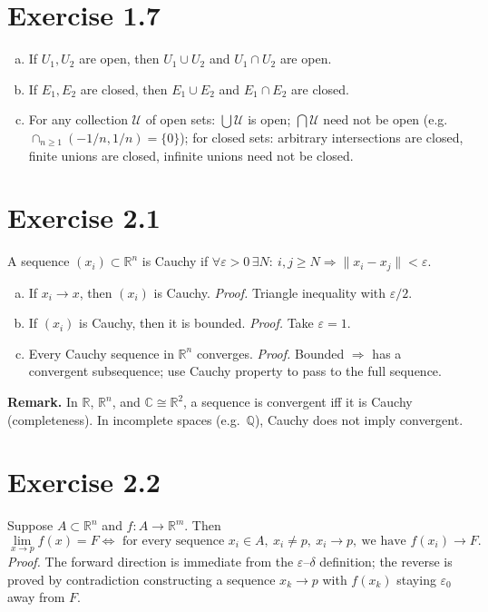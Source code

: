 \documentclass[11pt,a4paper]{article}
\begin{document}
\section*{Exercise 1.7}
\begin{enumerate}[a)]
\item If $U_1,U_2$ are open, then $U_1\cup U_2$ and $U_1\cap U_2$ are open.
\item If $E_1,E_2$ are closed, then $E_1\cup E_2$ and $E_1\cap E_2$ are closed.
\item For any collection $\mathcal U$ of open sets: $\bigcup\mathcal U$ is open; $\bigcap\mathcal U$ need not be open (e.g.\ $\cap_{n\ge1}(-1/n,1/n)=\{0\}$);
for closed sets: arbitrary intersections are closed, finite unions are closed, infinite unions need not be closed.
\end{enumerate}

\section*{Exercise 2.1}
A sequence $(x_i)\subset\mathbb{R}^n$ is Cauchy if $\forall\varepsilon>0\,\exists N:\ i,j\ge N\Rightarrow \|x_i-x_j\|<\varepsilon$.
\begin{enumerate}[a)]
\item If $x_i\to x$, then $(x_i)$ is Cauchy. \textit{Proof.} Triangle inequality with $\varepsilon/2$.
\item If $(x_i)$ is Cauchy, then it is bounded. \textit{Proof.} Take $\varepsilon=1$.
\item Every Cauchy sequence in $\mathbb{R}^n$ converges. \textit{Proof.} Bounded $\Rightarrow$ has a convergent subsequence; use Cauchy property to pass to the full sequence.
\end{enumerate}
\textbf{Remark.} In $\mathbb{R}$, $\mathbb{R}^n$, and $\mathbb{C}\cong\mathbb{R}^2$, a sequence is convergent iff it is Cauchy (completeness). In incomplete spaces (e.g.\ $\mathbb{Q}$), Cauchy does not imply convergent.

\section*{Exercise 2.2}
Suppose $A\subset\mathbb{R}^n$ and $f:A\to\mathbb{R}^m$. Then
\[
\lim_{x\to p}f(x)=F \iff \text{ for every sequence } x_i\in A,\ x_i\neq p,\ x_i\to p,\ \text{we have } f(x_i)\to F.
\]
\textit{Proof.} The forward direction is immediate from the $\varepsilon$--$\delta$ definition; the reverse is proved by contradiction constructing a sequence $x_k\to p$ with $f(x_k)$ staying $\varepsilon_0$ away from $F$.
\end{document}
